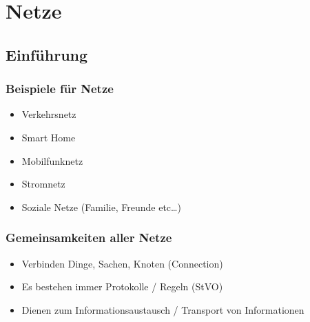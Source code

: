 \documentclass[12pt,a4paper]{article}
\begin{document}
\section{Netze}
	\subsection{Einführung}
		\subsubsection{Beispiele für Netze}
			\begin{itemize}
				\item Verkehrsnetz
				\item Smart Home
				\item Mobilfunknetz
				\item Stromnetz
				\item Soziale Netze (Familie, Freunde etc\dots)
			\end{itemize}
			
\subsubsection{Gemeinsamkeiten aller Netze}
	\begin{itemize}
		\item Verbinden Dinge, Sachen, Knoten (Connection)
		\item Es bestehen immer Protokolle / Regeln (StVO)
		\item Dienen zum Informationsaustausch / Transport von Informationen
	\end{itemize}
\end{document}
